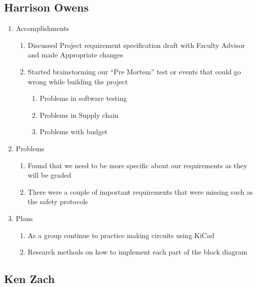 \documentclass{article}
\begin{document}
\subsection*{Harrison Owens}
\begin{enumerate}
\item{Accomplishments
    \begin{enumerate}
    \item{Discussed  Project requirement specification draft with Faculty Advisor and made Appropriate changes}
    \item{Started brainstorming  our ``Pre Mortem'' test or events that could go wrong while building the project
        \begin{enumerate}
        \item{Problems in software testing}
        \item{Problems in Supply chain}
        \item{Problems with budget}
        \end{enumerate}
    }
    \end{enumerate}
}
\item{Problems
    \begin{enumerate}
    \item{Found that we need to be more specific about our requirements as they will be graded}
    \item{There were a couple of important requirements that were missing such as the safety protocols}
    \end{enumerate}
}
\item{Plans
    \begin{enumerate}
    \item{As a group continue to practice making circuits using KiCad}
    \item{Research methods on how to implement each part of the block diagram}
    \end{enumerate}
}
\end{enumerate}

\subsection*{Ken Zach}
\end{document}

